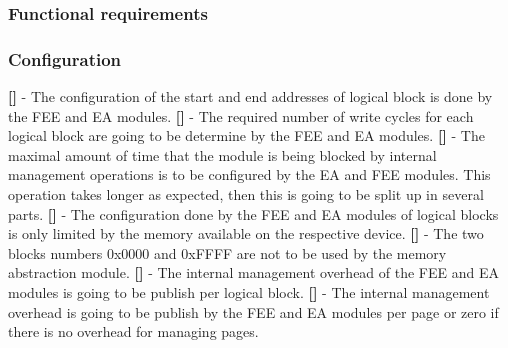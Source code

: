 \subsubsection{Functional requirements}
\subsubsection{Configuration}
{\bf []} - The configuration of the start and end addresses of logical block is done by the FEE and EA modules.\newline
\newline
{\bf []} - The required number of write cycles for each logical block are going to be determine by the FEE and EA modules.\newline
\newline
{\bf []} - The maximal amount of time that the module is being blocked by internal management operations is to be configured by the EA and FEE modules. This operation takes longer as expected, then this is going to be split up in several parts.\newline
\newline
{\bf []} - The configuration done by the FEE and EA modules of logical blocks is only limited by the memory available on the respective device.\newline
\newline
{\bf []} - The two blocks numbers 0x0000 and 0xFFFF are not to be used by the memory abstraction module.\newline
\newline
{\bf []} - The internal management overhead of the FEE and EA modules is going to be publish per logical block.\newline
\newline
{\bf []} - The internal management overhead is going to be publish by the FEE and EA modules per page or zero if there is no overhead for managing pages.

